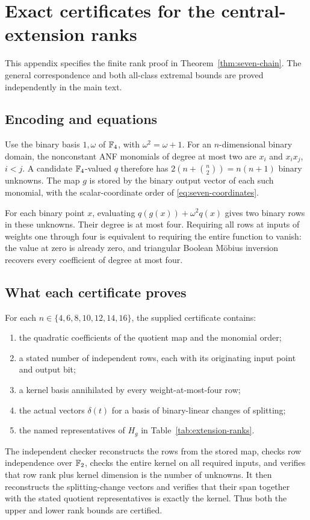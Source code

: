 \section{Exact certificates for the central-extension ranks}
\label{app:verification}

This appendix specifies the finite rank proof in
Theorem~\ref{thm:seven-chain}. The general correspondence and both
all-class extremal bounds are proved independently in the main text.

\subsection{Encoding and equations}

Use the binary basis \(1,\omega\) of \(\mathbb F_4\), with
\(\omega^2=\omega+1\). For an \(n\)-dimensional binary domain,
the nonconstant ANF monomials of degree at most two are
\(x_i\) and \(x_ix_j\), \(i<j\).
A candidate \(\mathbb F_4\)-valued \(q\) therefore has
\(2(n+\binom n2)=n(n+1)\) binary unknowns.
The map \(g\) is stored by the binary output vector of each such
monomial, with the scalar-coordinate order of
\eqref{eq:seven-coordinates}.

For each binary point \(x\), evaluating
\(q(g(x))+\omega^2q(x)\) gives two binary rows in these unknowns.
Their degree is at most four. Requiring all rows at inputs of weights
one through four is equivalent to requiring the entire function to
vanish: the value at zero is already zero, and triangular Boolean
M\"obius inversion recovers every coefficient of degree at most four.

\subsection{What each certificate proves}

For each \(n\in\{4,6,8,10,12,14,16\}\), the supplied certificate contains:
\begin{enumerate}
\item the quadratic coefficients of the quotient map and the monomial order;
\item a stated number of independent rows, each with its originating
      input point and output bit;
\item a kernel basis annihilated by every weight-at-most-four row;
\item the actual vectors \(\delta(t)\) for a basis of binary-linear
      changes of splitting;
\item the named representatives of \(H_g\) in
      Table~\ref{tab:extension-ranks}.
\end{enumerate}
The independent checker reconstructs the rows from the stored map,
checks row independence over \(\mathbb F_2\), checks the entire kernel on all
required inputs, and verifies that row rank plus kernel dimension is
the number of unknowns. It then reconstructs the splitting-change
vectors and verifies that their span together with the stated quotient
representatives is exactly the kernel.
Thus both the upper and lower rank bounds are certified.

